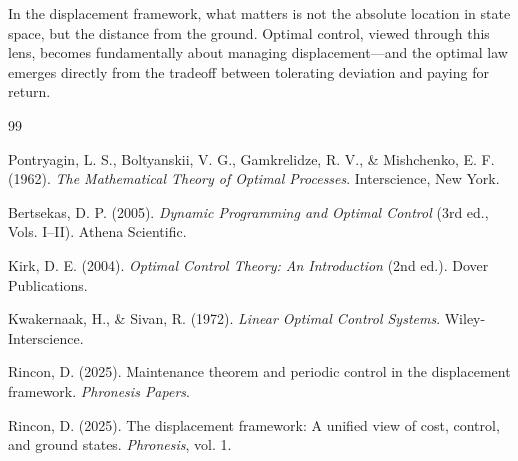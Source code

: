 \documentclass[11pt]{article}
\theoremstyle{definition}
\begin{document}
In the displacement framework, what matters is not the absolute location in state space, but the distance from the ground. Optimal control, viewed through this lens, becomes fundamentally about managing displacement---and the optimal law emerges directly from the tradeoff between tolerating deviation and paying for return.

\begin{thebibliography}{99}

 Pontryagin, L. S., Boltyanskii, V. G., Gamkrelidze, R. V., \& Mishchenko, E. F. (1962). \textit{The Mathematical Theory of Optimal Processes}. Interscience, New York.

 Bertsekas, D. P. (2005). \textit{Dynamic Programming and Optimal Control} (3rd ed., Vols. I--II). Athena Scientific.

 Kirk, D. E. (2004). \textit{Optimal Control Theory: An Introduction} (2nd ed.). Dover Publications.

 Kwakernaak, H., \& Sivan, R. (1972). \textit{Linear Optimal Control Systems}. Wiley-Interscience.

 Rincon, D. (2025). Maintenance theorem and periodic control in the displacement framework. \textit{Phronesis Papers}.

 Rincon, D. (2025). The displacement framework: A unified view of cost, control, and ground states. \textit{Phronesis}, vol. 1.

\end{thebibliography}
\end{document}
